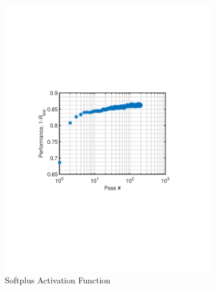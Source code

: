 \documentclass[journal,a4paper,onecolumn,11pt]{IEEEtran}
\begin{document}
\begin{figure}[!h]
	\centering
	\begin{subfigure}{.5\textwidth}
		\centering
			\includegraphics[clip, trim=0cm .25cm 0cm .5cm, width=\textwidth]{sp_200_86.pdf}
		\caption{Softplus Activation Function}
		\label{fig:sp_200_86}
	\end{subfigure}%
	\begin{subfigure}{.5\textwidth}
		\centering

\end{subfigure}
\end{figure}
\end{document}
